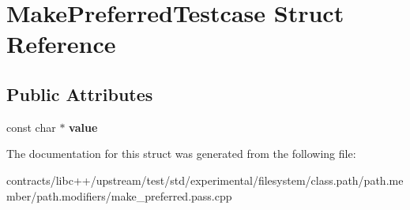 \hypertarget{struct_make_preferred_testcase}{}\section{Make\+Preferred\+Testcase Struct Reference}
\label{struct_make_preferred_testcase}
\subsection*{Public Attributes}
\begin{DoxyCompactItemize}
\item 
\mbox{\label{struct_make_preferred_testcase_af89271aea48ee21232ef5692bd868a55}} 
const char $\ast$ {\bfseries value}
\end{DoxyCompactItemize}


The documentation for this struct was generated from the following file\+:\begin{DoxyCompactItemize}
\item 
contracts/libc++/upstream/test/std/experimental/filesystem/class.\+path/path.\+member/path.\+modifiers/make\+\_\+preferred.\+pass.\+cpp\end{DoxyCompactItemize}
